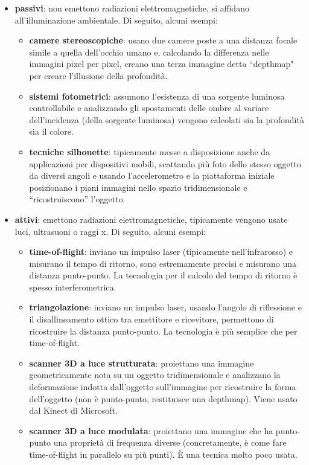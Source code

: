 \begin{itemize}
	\itemsep-0.3em 
	\item \textbf{passivi}: non emettono radiazioni elettromagnetiche, si affidano all'illuminazione ambientale. Di seguito, alcuni esempi:
	\vspace{-3.mm}
	\begin{itemize}
		\itemsep-0.3em
		\item \textbf{camere stereoscopiche}: usano due camere poste a una distanza focale simile a quella dell'occhio umano e, calcolando la differenza
		nelle immagini pixel per pixel, creano una terza immagine detta ``depthmap" per creare l'illusione della profondità.
		\item \textbf{sistemi fotometrici}: assumono l'esistenza di una sorgente luminosa controllabile e analizzando gli spostamenti delle ombre al variare
		dell'incidenza (della sorgente luminosa) vengono calcolati sia la profondità sia il colore.
		\item \textbf{tecniche silhouette}: tipicamente messe a disposizione anche da applicazioni per dispositivi mobili, scattando più foto dello stesso oggetto
		da diversi angoli e usando l'accelerometro e la piattaforma iniziale posizionano i piani immagini nello spazio tridimensionale e
		``ricostruiscono'' l'oggetto.
	\end{itemize}
	\item \textbf{attivi}: emettono radiazioni elettromagnetiche, tipicamente vengono usate luci, ultrasuoni o raggi x. Di seguito, alcuni esempi:
	\vspace{-3.mm}
	\begin{itemize}
		\itemsep-0.3em
		\item \textbf{time-of-flight}: inviano un impulso laser (tipicamente nell'infrarosso) e misurano il tempo di ritorno, sono estremamente precisi
		e misurano una distanza punto-punto. La tecnologia per il calcolo del tempo di ritorno è spesso interferometrica.
		\item \textbf{triangolazione}: inviano un impulso laser, usando l'angolo di riflessione e il disallineamento ottico tra emettitore e ricevitore,
		permettono di ricostruire la distanza punto-punto. La tecnologia è più semplice che per time-of-flight.
		\item \textbf{scanner 3D a luce strutturata}: proiettano una immagine geometricamente nota su un oggetto tridimensionale e analizzano la
		deformazione indotta dall'oggetto sull'immagine per ricostruire la forma dell'oggetto (non è punto-punto, restituisce una depthmap). Viene usato
		dal Kinect di Microsoft.
		\item \textbf{scanner 3D a luce modulata}: proiettano una immagine che ha punto-punto una proprietà di frequenza diverse (concretamente, è come
		fare time-of-flight in parallelo su più punti). \`E una tecnica molto poco usata.
	\end{itemize}
\end{itemize}

